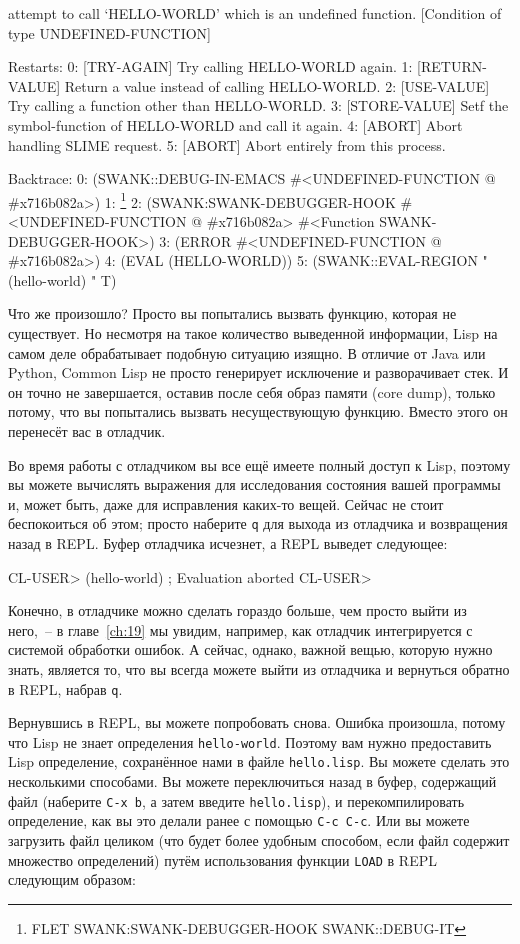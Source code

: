\begin{myverb}
attempt to call `HELLO-WORLD' which is an undefined function.
   [Condition of type UNDEFINED-FUNCTION]

Restarts:
   0: [TRY-AGAIN] Try calling HELLO-WORLD again.
   1: [RETURN-VALUE] Return a value instead of calling HELLO-WORLD.
   2: [USE-VALUE] Try calling a function other than HELLO-WORLD.
   3: [STORE-VALUE] Setf the symbol-function of HELLO-WORLD and call it again.
   4: [ABORT] Abort handling SLIME request.
   5: [ABORT] Abort entirely from this process.

Backtrace:
  0: (SWANK::DEBUG-IN-EMACS #<UNDEFINED-FUNCTION @ #x716b082a>)
  1: \footnote{FLET SWANK:SWANK-DEBUGGER-HOOK SWANK::DEBUG-IT}
  2: (SWANK:SWANK-DEBUGGER-HOOK #<UNDEFINED-FUNCTION @ #x716b082a> 
                                #<Function SWANK-DEBUGGER-HOOK>)
  3: (ERROR #<UNDEFINED-FUNCTION @ #x716b082a>)
  4: (EVAL (HELLO-WORLD))
  5: (SWANK::EVAL-REGION "(hello-world)
" T)
\end{myverb}

Что же произошло? Просто вы попытались вызвать функцию, которая не сущес\-твует. Но несмотря
на такое количество выведенной информации, Lisp на самом деле обрабатывает подобную ситуацию
изящно. В отличие от Java или Python, Common Lisp не просто генерирует исключение и
разворачивает стек. И он точно не завершается, оставив после себя образ памяти (core
dump), только потому, что вы попытались вызвать несуществующую функцию. Вместо этого он
перенесёт вас в отладчик.

Во время работы с отладчиком вы все ещё имеете полный доступ к Lisp, поэтому вы можете
вычислять выражения для исследования состояния вашей программы и, может быть, даже для
исправления каких-то вещей. Сейчас не стоит беспокоиться об этом; просто наберите \texttt{q} для
выхода из отладчика и возвращения назад в REPL. Буфер отладчика исчезнет, а REPL выведет
следующее:

\begin{myverb}
CL-USER> (hello-world) 
; Evaluation aborted
CL-USER>
\end{myverb}

Конечно, в отладчике можно сделать гораздо больше, чем просто выйти из него,~-- в
главе~\ref{ch:19} мы увидим, например, как отладчик интегрируется с системой обработки
ошибок.  А сейчас, однако, важной вещью, которую нужно знать, является то, что вы всегда
можете выйти из отладчика и вернуться обратно в REPL, набрав \texttt{q}.

Вернувшись в REPL, вы можете попробовать снова. Ошибка произошла, потому что Lisp не знает
определения \lstinline{hello-world}. Поэтому вам нужно предоставить Lisp определение, сохранённое нами
в файле \texttt{hello.lisp}. Вы можете сделать это несколькими способами. Вы можете переключиться
назад в буфер, содержащий файл (наберите \texttt{C-x b}, а затем введите \texttt{hello.lisp}), и
перекомпилировать определение, как вы это делали ранее с помощью \texttt{C-c C-c}. Или вы можете
загрузить файл целиком (что будет более удобным способом, если файл содержит множество
определений) путём использования функции \lstinline{LOAD} в REPL следующим образом:

